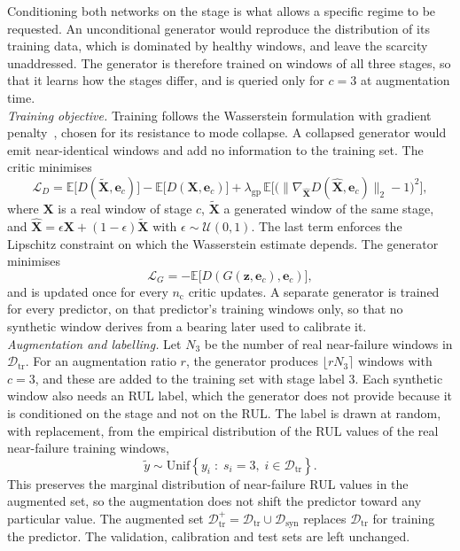 \documentclass[review]{elsarticle}
\begin{document}
Conditioning both networks on the stage is what allows a specific
regime to be requested. An unconditional generator would reproduce the
distribution of its training data, which is dominated by healthy
windows, and leave the scarcity unaddressed. The generator is
therefore trained on windows of all three stages, so that it learns
how the stages differ, and is queried only for $c = 3$ at
augmentation time.\\

\textit{Training objective.} Training follows the Wasserstein
formulation with gradient penalty~\cite{NIPS2017_892c3b1c}, chosen for
its resistance to mode collapse. A collapsed generator would emit
near-identical windows and add no information to the training set.
The critic minimises
\begin{equation}
  \mathcal{L}_{D} =
  \mathbb{E}\big[ D(\tilde{\mathbf{X}}, \mathbf{e}_c) \big]
  - \mathbb{E}\big[ D(\mathbf{X}, \mathbf{e}_c) \big]
  + \lambda_{\mathrm{gp}}\,
  \mathbb{E}\Big[ \big( \lVert \nabla_{\hat{\mathbf{X}}}
  D(\hat{\mathbf{X}}, \mathbf{e}_c) \rVert_2 - 1 \big)^2 \Big],
  \label{eq:critic_loss}
\end{equation}
where $\mathbf{X}$ is a real window of stage $c$, $\tilde{\mathbf{X}}$
a generated window of the same stage, and
$\hat{\mathbf{X}} = \epsilon \mathbf{X} + (1-\epsilon)
\tilde{\mathbf{X}}$ with $\epsilon \sim \mathcal{U}(0,1)$. The last
term enforces the Lipschitz constraint on which the Wasserstein
estimate depends. The generator minimises
\begin{equation}
  \mathcal{L}_{G} =
  - \mathbb{E}\big[ D(G(\mathbf{z}, \mathbf{e}_c), \mathbf{e}_c) \big],
  \label{eq:gen_loss}
\end{equation}
and is updated once for every $n_{\mathrm{c}}$ critic updates. A
separate generator is trained for every predictor, on that predictor's
training windows only, so that no synthetic window derives from a
bearing later used to calibrate it.\\

\textit{Augmentation and labelling.} Let $N_3$ be the number of real
near-failure windows in $\mathcal{D}_{\mathrm{tr}}$. For an
augmentation ratio $r$, the generator produces
$\lfloor r N_3 \rceil$ windows with $c = 3$, and these are added to the
training set with stage label 3. Each synthetic window also needs an
RUL label, which the generator does not provide because it is
conditioned on the stage and not on the RUL. The label is drawn at
random, with replacement, from the empirical distribution of the RUL
values of the real near-failure training windows,
\begin{equation}
  \tilde{y} \sim \mathrm{Unif}\left\{ y_i \;:\; s_i = 3,\;
  i \in \mathcal{D}_{\mathrm{tr}} \right\}.
  \label{eq:syn_label}
\end{equation}
This preserves the marginal distribution of near-failure RUL values in
the augmented set, so the augmentation does not shift the predictor
toward any particular value. The augmented set
$\mathcal{D}_{\mathrm{tr}}^{+} = \mathcal{D}_{\mathrm{tr}} \cup
\mathcal{D}_{\mathrm{syn}}$ replaces $\mathcal{D}_{\mathrm{tr}}$ for
training the predictor. The validation, calibration and test sets are
left unchanged.
\end{document}

